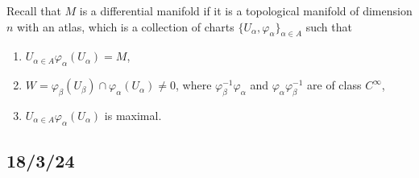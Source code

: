 \begin{Rmk}\label{Rmk: Differentiable manifold}
    Recall that $M$ is a differential manifold if it is a topological manifold of dimension $n$ with an atlas, which is a collection of charts $\{U_\alpha,\varphi_\alpha\}_{\alpha\in A}$ such that
    \begin{enumerate}[label=\RmkLbl]

        \item $U_{\alpha\in A} \varphi_\alpha(U_\alpha) = M$,

        \item $W = \varphi_\beta(U_\beta)\cap\varphi_\alpha(U_\alpha)\neq 0$, where $\varphi_\beta^{-1}\varphi_\alpha$ and $\varphi_\alpha\varphi_\beta^{-1}$ are of class $C^\infty$,

        \item $U_{\alpha\in A} \varphi_\alpha(U_\alpha)$ is maximal.
    \end{enumerate}
\end{Rmk}

\begin{Exp}\label{Exp: Differentiable manifolds}
\end{Exp}

\subsection*{18/3/24}\label{Sec: 18/3/24}
